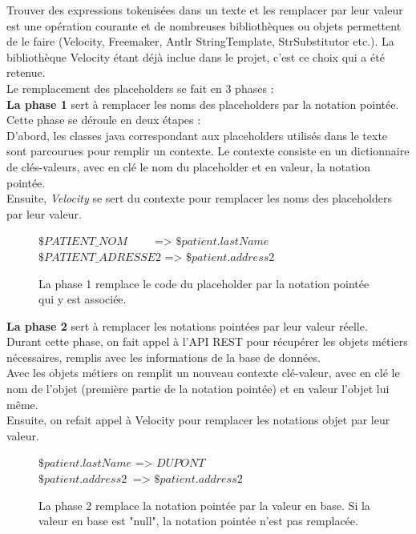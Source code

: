 Trouver des expressions tokenisées dans un texte et les remplacer par leur valeur est une opération courante et de nombreuses bibliothèques ou objets permettent de le faire (Velocity, Freemaker, Antlr StringTemplate, StrSubstitutor etc.).
La bibliothèque Velocity étant déjà inclue dans le projet, c'est ce choix qui a été retenue.\\

Le remplacement des placeholders se fait en 3 phases : \\

\textbf{La phase 1} sert à remplacer les noms des placeholders par la notation pointée.\\
Cette phase se déroule en deux étapes : \\
D'abord, les classes java correspondant aux placeholders utilisés dans le texte sont parcourues pour remplir un contexte. Le contexte consiste en un dictionnaire de clés-valeurs, avec en clé le nom du placeholder et en valeur, la notation pointée.\\
Ensuite, \textit{Velocity} se sert du contexte pour remplacer les noms des placeholders par leur valeur.
\begin{figure}[H]
  \color{darkgray} 
  \centering
  $\$PATIENT\_NOM$ $~~~~~~~~$  => $\$patient.lastName$\\
  $\$PATIENT\_ADRESSE2$  => $\$patient.address2$
  \caption{\color{black} \label{fig:annotations} La phase 1 remplace le code du placeholder par la notation pointée qui y est associée.}
\end{figure}

\textbf{La phase 2} sert à remplacer les notations pointées par leur valeur réelle.\\
Durant cette phase, on fait appel à l'API REST pour récupérer les objets métiers nécessaires, remplis avec les informations de la base de données.\\
Avec les objets métiers on remplit un nouveau contexte clé-valeur, avec en clé le nom de l'objet (première partie de la notation pointée) et en valeur l'objet lui même.\\
Ensuite, on refait appel à Velocity pour remplacer les notations objet par leur valeur.
\begin{figure}[H]
  \color{darkgray} 
  \centering
  $\$patient.lastName$ => $DUPONT$ $~~~~~~~~$\\
  $\$patient.address2~$ => $\$patient.address2$ 
  \caption{\color{black} \label{fig:annotations} La phase 2 remplace la notation pointée par la valeur en base. Si la valeur en base est "null", la notation pointée n'est pas remplacée.}
\end{figure}

